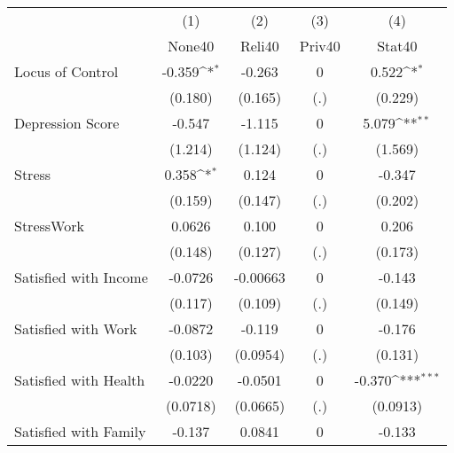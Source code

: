 {
\def\sym#1{\ifmmode^{#1}\else\(^{#1}\)\fi}
\begin{tabular}{l*{4}{c}}
\hline\hline
            &\multicolumn{1}{c}{(1)}&\multicolumn{1}{c}{(2)}&\multicolumn{1}{c}{(3)}&\multicolumn{1}{c}{(4)}\\
            &\multicolumn{1}{c}{None40}&\multicolumn{1}{c}{Reli40}&\multicolumn{1}{c}{Priv40}&\multicolumn{1}{c}{Stat40}\\
\hline
Locus of Control&      -0.359\sym{*}  &      -0.263         &           0         &       0.522\sym{*}  \\
            &     (0.180)         &     (0.165)         &         (.)         &     (0.229)         \\
[1em]
Depression Score&      -0.547         &      -1.115         &           0         &       5.079\sym{**} \\
            &     (1.214)         &     (1.124)         &         (.)         &     (1.569)         \\
[1em]
Stress      &       0.358\sym{*}  &       0.124         &           0         &      -0.347         \\
            &     (0.159)         &     (0.147)         &         (.)         &     (0.202)         \\
[1em]
StressWork  &      0.0626         &       0.100         &           0         &       0.206         \\
            &     (0.148)         &     (0.127)         &         (.)         &     (0.173)         \\
[1em]
Satisfied with Income&     -0.0726         &    -0.00663         &           0         &      -0.143         \\
            &     (0.117)         &     (0.109)         &         (.)         &     (0.149)         \\
[1em]
Satisfied with Work&     -0.0872         &      -0.119         &           0         &      -0.176         \\
            &     (0.103)         &    (0.0954)         &         (.)         &     (0.131)         \\
[1em]
Satisfied with Health&     -0.0220         &     -0.0501         &           0         &      -0.370\sym{***}\\
            &    (0.0718)         &    (0.0665)         &         (.)         &    (0.0913)         \\
[1em]
Satisfied with Family&      -0.137         &      0.0841         &           0         &      -0.133         \\

\end{tabular}}
